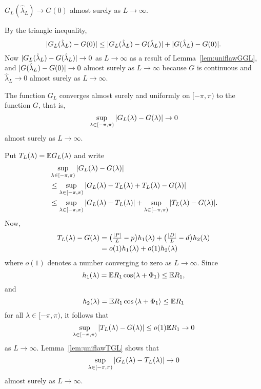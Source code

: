 \documentclass[journal]{IEEEtran}
\begin{document}
\begin{lemma}\label{lem:GLtoG0}
$G_L(\hat{\lambda}_L) \rightarrow G(0)$ almost surely as $L \rightarrow \infty$.
\end{lemma}
\begin{IEEEproof}
By the triangle inequality,
\[
{\vert G_L(\hat{\lambda}_L) - G(0) \vert} \leq {\vert G_L(\hat{\lambda}_L) - G(\hat{\lambda}_L) \vert} + {\vert G(\hat{\lambda}_L) - G(0) \vert}.
\]
Now ${\vert G_L(\hat{\lambda}_L) - G(\hat{\lambda}_L) \vert} \rightarrow 0$ as $L \rightarrow \infty$ as a result of Lemma~\ref{lem:uniflawGGL}, and ${\vert G(\hat{\lambda}_L) - G(0) \vert} \rightarrow 0$ almost surely as $L \rightarrow \infty$ because $G$ is continuous and $\hat{\lambda}_L \rightarrow 0$ almost surely as $L \rightarrow \infty$.
\end{IEEEproof}
 

\begin{lemma}\label{lem:uniflawGGL}
The function $G_L$ converges almost surely and uniformly on $[-\pi, \pi)$ to the function $G$, that is,
\[
\sup_{\lambda \in [-\pi, \pi)}{\vert G_L(\lambda) - G(\lambda) \vert} \rightarrow 0
\] 
almost surely as $L \rightarrow \infty$.
\end{lemma}
\begin{IEEEproof}
Put $T_L(\lambda) = {\mathbb E} G_L(\lambda)$ and write
\begin{align*}
&\sup_{\lambda \in [-\pi, \pi)}{\vert G_L(\lambda) - G(\lambda) \vert} \\
&\leq \sup_{\lambda \in [-\pi, \pi)}{\vert G_L(\lambda) - T_L(\lambda) + T_L(\lambda) - G(\lambda) \vert} \\
&\leq \sup_{\lambda \in [-\pi, \pi)}{\vert G_L(\lambda) - T_L(\lambda) \vert} +  \sup_{\lambda \in [-\pi, \pi)}{\vert T_L(\lambda) - G(\lambda) \vert}.
\end{align*}
Now,
\begin{align*}
T_L(\lambda) - G(\lambda) &= \big(\tfrac{{\left\vert P \right\vert}}{L} - p\big)h_1(\lambda) + \big(\tfrac{{\left\vert D \right\vert}}{L} - d\big)h_2(\lambda) \\
&= o(1) h_1(\lambda) + o(1) h_2(\lambda)
\end{align*}
where $o(1)$ denotes a number converging to zero as $L \rightarrow \infty$.  Since 
\[
h_1(\lambda) = {\mathbb E} R_1\cos(\lambda + \Phi_1) \leq {\mathbb E} R_1,
\]
and 
\[
h_2(\lambda) = {\mathbb E} R_1\cos\left\langle \lambda + \Phi_1 \right\rangle \leq {\mathbb E} R_1
\] 
for all $\lambda \in [-\pi, \pi)$, it follows that 
\[
\sup_{\lambda \in [-\pi, \pi)}{\vert T_L(\lambda) - G(\lambda) \vert} \leq o(1) {\mathbb E} R_1 \rightarrow 0
\]  
as $L\rightarrow \infty$.  Lemma~\ref{lem:uniflawTGL} shows that 
\[
\sup_{\lambda \in [-\pi, \pi)}{\vert G_L(\lambda) - T_L(\lambda) \vert} \rightarrow 0
\]
almost surely as $L\rightarrow \infty$.
\end{IEEEproof}
\end{document}
